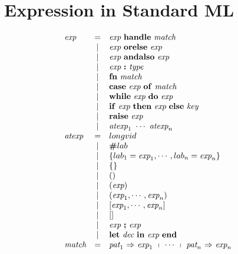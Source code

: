 \documentclass[11pt,a4paper]{article}
\newcommand{\key}[1]{\textrm{\textbf{#1}}}
\newcommand{\prodlhs}[1]{\textit{#1}}
\newcommand{\braced}[1]{\{#1\}}
\begin{document}
\section {Expression in Standard ML}
{\renewcommand{\arraystretch}{1.2}\[
\begin{array}{lcll}
\prodlhs{exp}
    & = & \prodlhs{exp}\ \key{handle}\ \prodlhs{match}                              &\\        
    & | & \prodlhs{exp}\ \key{orelse}\ \prodlhs{exp}                                &\\
    & | & \prodlhs{exp}\ \key{andalso}\ \prodlhs{exp}                               &\\
    & | & \prodlhs{exp}\ \key{:}\ \prodlhs{type}                                    &\\
    & | & \key{fn}\ \prodlhs{match}                                                 &\\
    & | & \key{case}\ \prodlhs{exp}\ \key{of}\ \prodlhs{match}                      &\\
    & | & \key{while}\ \prodlhs{exp}\ \key{do}\ \prodlhs{exp}                       &\\
    & | & \key{if}\ \prodlhs{exp}\ \key{then}\ \prodlhs{exp}\ \key{else}\ \prodlhs{key} &\\
    & | & \key{raise}\ \prodlhs{exp}                                                &\\
    & | & \prodlhs{atexp}_1\ \cdots\ \prodlhs{atexp}_n                              &\\
\prodlhs{atexp}
    & = & longvid                                                                   &\\
    & | & \key{\#}lab                                                               &\\
    & | & \braced{lab_1=\prodlhs{exp}_1,\cdots,lab_n=\prodlhs{exp}_n}               &\\
    & | & \braced{}                                                                 &\\
    & | & ()                                                                        &\\
    & | & (\prodlhs{exp})                                                           &\\
    & | & (\prodlhs{exp}_1, \cdots, \prodlhs{exp}_n)                                &\\
    & | & [\prodlhs{exp}_1, \cdots, \prodlhs{exp}_n]                                &\\
    & | & []                                                                        &\\
    & | & \prodlhs{exp}\ \key{;}\ \prodlhs{exp}                                     &\\
    & | & \key{let}\ \prodlhs{dec}\ \key{in}\ \prodlhs{exp}\ \key{end}              &\\
\prodlhs{match}
    & = & \prodlhs{pat}_1\ \key{$\Rightarrow$}\ \prodlhs{exp}_1\ \shortmid\ \cdots\ \shortmid\ \prodlhs{pat}_n\ \key{$\Rightarrow$}\ \prodlhs{exp}_n & \\
\end{array}
\]}
\end{document}

